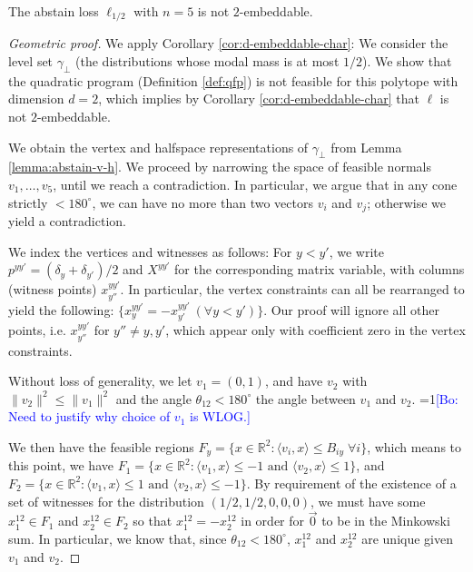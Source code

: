\documentclass[anon]{colt2020} %
\newcommand{\Comments}{1}
\newcommand{\mynote}[2]{\ifnum\Comments=1\textcolor{#1}{#2}\fi}
\newcommand{\bo}[1]{\mynote{blue}{[Bo: #1]}}
\newcommand{\reals}{\mathbb{R}}
\newcommand{\inprod}[2]{\langle #1, #2 \rangle}%
\begin{document}
\begin{proposition}
	The abstain loss $\ell_{1/2}$ with $n=5$ is not $2$-embeddable.
\end{proposition}
\begin{proof}[Geometric proof]
  We apply Corollary \ref{cor:d-embeddable-char}: We consider the level set $\gamma_{\bot}$ (the distributions whose modal mass is at most $1/2$).
  We show that the quadratic program (Definition \ref{def:qfp}) is not feasible for this polytope with dimension $d=2$, which implies by Corollary \ref{cor:d-embeddable-char} that $\ell$ is not $2$-embeddable.

  We obtain the vertex and halfspace representations of $\gamma_{\bot}$ from Lemma \ref{lemma:abstain-v-h}.
  We proceed by narrowing the space of feasible normals $v_1, \ldots, v_5$, until we reach a contradiction.
  In particular, we argue that in any cone strictly $ < 180^\circ$, we can have no more than two vectors $v_i$ and $v_j$; otherwise we yield a contradiction.

  We index the vertices and witnesses as follows: For $y < y'$, we write $p^{yy'} = (\delta_y + \delta_{y'})/2$ and $X^{yy'}$ for the corresponding matrix variable, with columns (witness points) $x^{yy'}_{y''}$.
  In particular, the vertex constraints can all be rearranged to yield the following: $\{x^{yy'}_y = -x^{yy'}_{y'} ~ (\forall y < y')\}$.
  Our proof will ignore all other points, i.e. $x^{yy'}_{y''}$ for $y'' \neq y,y'$, which appear only with coefficient zero in the vertex constraints.

  Without loss of generality, we let $v_1 = (0,1)$, and have $v_2$ with $\|v_2\|^2 \leq \|v_1\|^2$ and the angle $\theta_{12} < 180^\circ$ the angle between $v_1$ and $v_2$. \bo{Need to justify why choice of $v_1$ is WLOG.}

  We then have the feasible regions $F_y = \{x \in \reals^2 : \inprod{v_i} {x} \leq B_{iy} \; \forall i\}$, which means to this point, we have $F_1 = \{x \in \reals^2 : \inprod{v_1}{x} \leq -1 \text{ and } \inprod{v_2}{x} \leq 1 \}$, and $F_2 = \{x \in \reals^2 : \inprod{v_1}{x} \leq 1 \text{ and } \inprod{v_2}{x} \leq -1 \}$.
  By requirement of the existence of a set of witnesses for the distribution $(1/2, 1/2, 0,0,0)$, we must have some $x^{12}_1 \in F_1$ and $x^{12}_2 \in F_2$ so that $x^{12}_1 = -x^{12}_2$ in order for $\vec 0$ to be in the Minkowski sum.
  In particular, we know that, since $\theta_{12} < 180^\circ$, $x^{12}_1$ and $x^{12}_2$ are unique given $v_1$ and $v_2$.


\end{proof}
\end{document}
